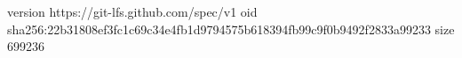 version https://git-lfs.github.com/spec/v1
oid sha256:22b31808ef3fc1c69c34e4fb1d9794575b618394fb99c9f0b9492f2833a99233
size 699236
